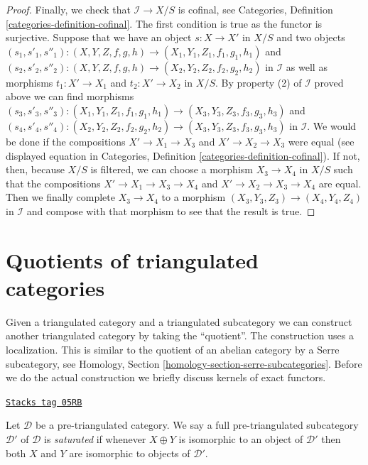 \begin{proof}
\medskip\noindent
Finally, we check that $\mathcal{I} \to X/S$ is cofinal, see
Categories, Definition \ref{categories-definition-cofinal}.
The first condition is true as the functor is surjective.
Suppose that we have an object $s : X \to X'$ in $X/S$ and
two objects
$(s_1, s'_1, s''_1) : (X, Y, Z, f, g, h) \to (X_1, Y_1, Z_1, f_1, g_1, h_1)$
and
$(s_2, s'_2, s''_2) : (X, Y, Z, f, g, h) \to (X_2, Y_2, Z_2, f_2, g_2, h_2)$
in $\mathcal{I}$ as well as morphisms $t_1 : X' \to X_1$ and
$t_2 : X' \to X_2$ in $X/S$. By property (2) of $\mathcal{I}$
proved above we can find morphisms
$(s_3, s'_3, s''_3) : (X_1, Y_1, Z_1, f_1, g_1, h_1) \to
(X_3, Y_3, Z_3, f_3, g_3, h_3)$
and
$(s_4, s'_4, s''_4) : (X_2, Y_2, Z_2, f_2, g_2, h_2) \to
(X_3, Y_3, Z_3, f_3, g_3, h_3)$ in $\mathcal{I}$.
We would be done if the compositions
$X' \to X_1 \to X_3$ and $X' \to X_2 \to X_3$ were equal
(see displayed equation in
Categories, Definition \ref{categories-definition-cofinal}).
If not, then, because $X/S$ is filtered, we can choose
a morphism $X_3 \to X_4$ in $X/S$ such that the compositions
$X' \to X_1 \to X_3 \to X_4$ and $X' \to X_2 \to X_3 \to X_4$ are equal.
Then we finally complete $X_3 \to X_4$ to a morphism
$(X_3, Y_3, Z_3) \to (X_4, Y_4, Z_4)$ in $\mathcal{I}$
and compose with that morphism to see that the result is true.
\end{proof}

\section{Quotients of triangulated categories}
\label{derived-section-quotients}
Given a triangulated category and a triangulated subcategory we can
construct another triangulated category by taking the ``quotient''.
The construction uses a localization. This is similar to the quotient
of an abelian category by a Serre subcategory, see
Homology, Section \ref{homology-section-serre-subcategories}.
Before we do the actual construction we briefly discuss kernels
of exact functors.

\begin{definition}[Saturated]
\label{derived-definition-saturated}
\href{https://stacks.math.columbia.edu/tag/05RB}{\texttt{Stacks tag 05RB}}

Let $\mathcal{D}$ be a pre-triangulated category. We say a full
pre-triangulated subcategory $\mathcal{D}'$ of $\mathcal{D}$ is
{\it saturated} if whenever $X \oplus Y$ is isomorphic to an object
of $\mathcal{D}'$ then both $X$ and $Y$ are isomorphic to objects
of $\mathcal{D}'$.
\end{definition}

